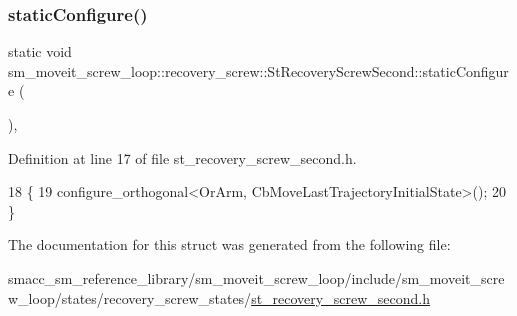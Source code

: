 \subsubsection{\texorpdfstring{static\+Configure()}{staticConfigure()}}
{\footnotesize\ttfamily static void sm\+\_\+moveit\+\_\+screw\+\_\+loop\+::recovery\+\_\+screw\+::\+St\+Recovery\+Screw\+Second\+::static\+Configure (\begin{DoxyParamCaption}{ }\end{DoxyParamCaption})\hspace{0.3cm}{\ttfamily [inline]}, {\ttfamily [static]}}



Definition at line 17 of file st\+\_\+recovery\+\_\+screw\+\_\+second.\+h.


\begin{DoxyCode}
18             \{
19                 configure\_orthogonal<OrArm, CbMoveLastTrajectoryInitialState>();
20             \}
\end{DoxyCode}


The documentation for this struct was generated from the following file\+:\begin{DoxyCompactItemize}
\item 
smacc\+\_\+sm\+\_\+reference\+\_\+library/sm\+\_\+moveit\+\_\+screw\+\_\+loop/include/sm\+\_\+moveit\+\_\+screw\+\_\+loop/states/recovery\+\_\+screw\+\_\+states/\hyperlink{st__recovery__screw__second_8h}{st\+\_\+recovery\+\_\+screw\+\_\+second.\+h}\end{DoxyCompactItemize}
